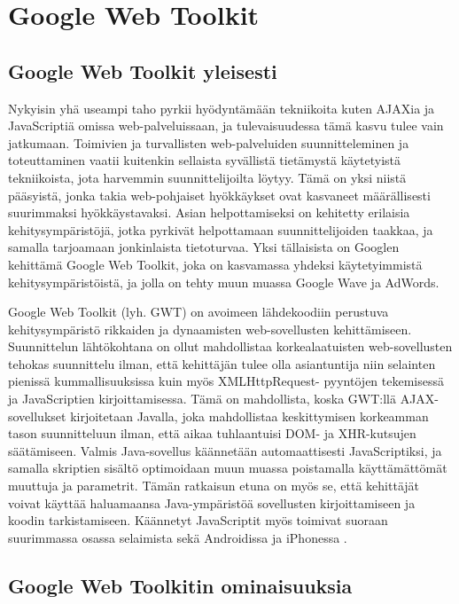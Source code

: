 \section{Google Web Toolkit}

\subsection{Google Web Toolkit yleisesti}

Nykyisin yhä useampi taho pyrkii hyödyntämään tekniikoita kuten AJAXia ja JavaScriptiä omissa web-palveluissaan, ja tulevaisuudessa tämä kasvu tulee vain jatkumaan. Toimivien ja 
turvallisten  web-palveluiden suunnitteleminen ja toteuttaminen vaatii kuitenkin sellaista syvällistä tietämystä käytetyistä tekniikoista, jota harvemmin suunnittelijoilta löytyy. 
Tämä on yksi  niistä pääsyistä, jonka takia web-pohjaiset hyökkäykset ovat kasvaneet määrällisesti suurimmaksi hyökkäystavaksi. Asian helpottamiseksi on kehitetty erilaisia 
kehitysympäristöjä, jotka pyrkivät helpottamaan suunnittelijoiden taakkaa, ja samalla tarjoamaan jonkinlaista tietoturvaa. Yksi tällaisista on Googlen kehittämä Google Web Toolkit, 
joka on kasvamassa yhdeksi käytetyimmistä kehitysympäristöistä, ja jolla on tehty muun muassa Google Wave ja AdWords.

Google Web Toolkit (lyh. GWT) on avoimeen lähdekoodiin perustuva kehitysympäristö rikkaiden ja dynaamisten web-sovellusten kehittämiseen. Suunnittelun lähtökohtana on ollut mahdollistaa
korkealaatuisten web-sovellusten tehokas suunnittelu ilman, että kehittäjän tulee olla asiantuntija niin selainten pienissä kummallisuuksissa kuin myös XMLHttpRequest- pyyntöjen
tekemisessä ja JavaScriptien kirjoittamisessa. Tämä on mahdollista, koska GWT:llä AJAX-sovellukset kirjoitetaan Javalla, joka mahdollistaa keskittymisen korkeamman tason suunnitteluun 
ilman, että aikaa tuhlaantuisi DOM- ja XHR-kutsujen säätämiseen. Valmis Java-sovellus käännetään automaattisesti JavaScriptiksi, ja samalla skriptien sisältö optimoidaan muun muassa
poistamalla käyttämättömät muuttuja ja parametrit. Tämän ratkaisun etuna on myös se, että kehittäjät voivat käyttää haluamaansa Java-ympäristöä sovellusten kirjoittamiseen ja koodin 
tarkistamiseen. Käännetyt JavaScriptit myös toimivat suoraan suurimmassa osassa selaimista sekä Androidissa ja iPhonessa \cite{GWT}.

\subsection{Google Web Toolkitin ominaisuuksia}

